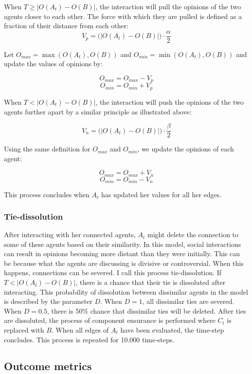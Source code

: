 \documentclass{article}
\begin{document}
When $T \geq |O(A_t) - O(B)|$, the interaction will pull the opinions of the two agents closer to each other. The force with which they are pulled is defined as a fraction of their distance from each other:
$$V_p = \big(|O(A_t) - O(B)|\big) \cdot \frac{\alpha}{2}$$

Let $O_{max} = \max(O(A_t), O(B))$ and $O_{min} = \min(O(A_t), O(B))$ and update the values of opinions by:

$$O_{max} = O_{max} - V_p$$
$$O_{min} = O_{min} + V_p$$

When $T < |O(A_t) - O(B)|$, the interaction will push the opinions of the two agents further apart by a similar principle as illustrated above: 

$$V_n = \big(|O(A_t) - O(B)|\big) \cdot \frac{\beta}{2}$$

Using the same definition for $O_{max}$ and $O_{min}$, we update the opinions of each agent:

$$O_{max} = O_{max} + V_n$$
$$O_{min} = O_{min} - V_n$$

This process concludes when $A_t$ has updated her values for all her edges.

\subsubsection{Tie-dissolution}
After interacting with her connected agents, $A_t$ might delete the connection to some of these agents based on their similarity.
In this model, social interactions can result in opinions becoming more distant than they were initially. 
This can be because what the agents are discussing is divisive or controversial. When this happens, connections can be severed.
I call this process tie-dissolution. 
If $T < |O(A_t) - O(B)|$, there is a chance that their tie is dissoluted after interacting. This probability of dissolution between dissimilar agents in the model is described by the parameter $D$.
When $D = 1$, all dissimilar ties are severed. When $D = 0.5$, there is 50\% chance that dissimilar ties will be deleted. 
After ties are dissoluted, the process of component ensurance is performed where $C_t$ is replaced with $B$.
When all edges of $A_t$ have been evaluated, the time-step concludes. This process is repeated for 10.000 time-steps.

\subsection{Outcome metrics} 
\end{document}
